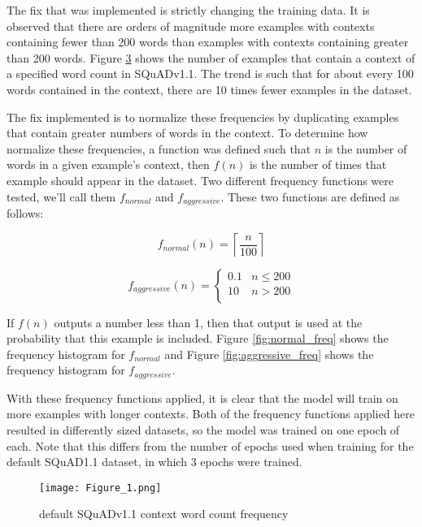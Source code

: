 \documentclass[twocolumn]{article}
\begin{document}
The fix that was implemented is strictly changing the training data. It is observed that there are
orders of magnitude more examples with contexts containing fewer than 200 words than examples with
contexts containing greater than 200 words. Figure \ref{fig:default_freq} shows the number of examples
that contain a context of a specified word count in SQuADv1.1. The trend is such that for about
every 100 words contained in the context, there are 10 times fewer examples in the dataset.

The fix implemented is to normalize these frequencies by duplicating examples that contain greater
numbers of words in the context. To determine how normalize these frequencies, a function was defined
such that $n$ is the number of words in a given example's context, then $f(n)$ is the number of times
that example should appear in the dataset.
Two different frequency functions were tested, we'll call them
$f_{normal}$ and $f_{aggressive}$. These two functions are defined as follows:

\begin{figure}
\[
  f_{normal}(n) = \left\lceil \frac{n}{100}\right\rceil
\]
  \label{fig:normal_func}
\end{figure}

\begin{figure}
\[
  f_{aggressive}(n) = \begin{cases} 
    0.1 & n \leq 200 \\
    10 & n > 200 \\
  \end{cases}
\]
  \label{fig:aggressive_func}
\end{figure}

If $f(n)$ outputs a number less than 1, then that output is used at the probability that this example
is included. Figure \ref{fig:normal_freq} shows the frequency histogram for $f_{normal}$ and Figure
\ref{fig:aggressive_freq} shows the frequency histogram for $f_{aggressive}$.

With these frequency functions applied, it is clear that the model will train on more examples with
longer contexts. Both of the frequency functions applied here resulted in differently sized datasets,
so the model was trained on one epoch of each. Note that this differs from the number of epochs used
when training for the default SQuAD1.1 dataset, in which 3 epochs were trained.

\begin{figure}
  \texttt{[image: Figure\_1.png]}
  \caption{default SQuADv1.1 context word count frequency}
  \label{fig:default_freq}
\end{figure}
\end{document}
